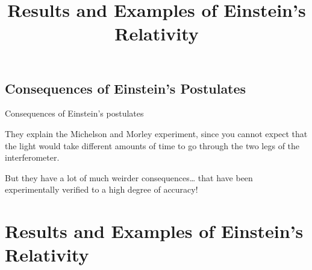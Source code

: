 \documentclass[aspectratio=169,
hyperref={colorlinks,urlcolor=blue}
]{beamer}
\begin{document}



\subsection{Consequences of Einstein's Postulates}
\label{subsec:consequencesofeinsteinspostulates}
\begin{bulletframe}{Consequences of Einstein’s postulates}
\item They explain the Michelson and Morley experiment, since you cannot expect that the light would take different amounts of time to go through the two legs of the interferometer. 
\item But they have a lot of much weirder consequences… that have been experimentally verified to a high degree of accuracy!
\end{bulletframe}










\section{Results and Examples of Einstein's Relativity}
\label{sec:resultsandexamplesofeinstensrelativity}
\title{Results and Examples of Einstein's Relativity}


\begin{frame}
\titlepage
\thispagestyle{empty}
\end{frame}






\end{document}
